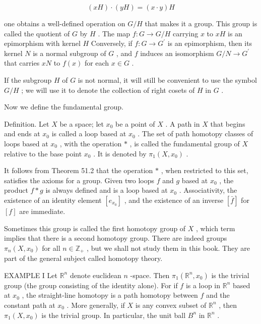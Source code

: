 \[
\left( {xH}\right)  \cdot  \left( {yH}\right)  = \left( {x \cdot  y}\right) H
\]

one obtains a well-defined operation on \(G/H\) that makes it a group. This group is called the quotient of \(G\) by \(H\) . The map \(f : G \rightarrow  G/H\) carrying \(x\) to \({xH}\) is an epimorphism with kernel \(H\) Conversely, if \(f : G \rightarrow  {G}^{\prime }\) is an epimorphism, then its kernel \(N\) is a normal subgroup of \(G\) , and \(f\) induces an isomorphism \(G/N \rightarrow  {G}^{\prime }\) that carries \({xN}\) to \(f\left( x\right)\) for each \(x \in  G\) .

If the subgroup \(H\) of \(G\) is not normal, it will still be convenient to use the symbol \(G/H\) ; we will use it to denote the collection of right cosets of \(H\) in \(G\) .

Now we define the fundamental group.

Definition. Let \(X\) be a space; let \({x}_{0}\) be a point of \(X\) . A path in \(X\) that begins and ends at \({x}_{0}\) is called a loop based at \({x}_{0}\) . The set of path homotopy classes of loops based at \({x}_{0}\) , with the operation \(*\) , is called the fundamental group of \(X\) relative to the base point \({x}_{0}\) . It is denoted by \({\pi }_{1}\left( {X,{x}_{0}}\right)\) .

It follows from Theorem 51.2 that the operation \(*\) , when restricted to this set, satisfies the axioms for a group. Given two loops \(f\) and \(g\) based at \({x}_{0}\) , the product \(f * g\) is always defined and is a loop based at \({x}_{0}\) . Associativity, the existence of an identity element \(\left\lbrack  {e}_{{x}_{0}}\right\rbrack\) , and the existence of an inverse \(\left\lbrack  \bar{f}\right\rbrack\) for \(\left\lbrack  f\right\rbrack\) are immediate.

Sometimes this group is called the first homotopy group of \(X\) , which term implies that there is a second homotopy group. There are indeed groups \({\pi }_{n}\left( {X,{x}_{0}}\right)\) for all \(n \in  {\mathbb{Z}}_{ + }\) , but we shall not study them in this book. They are part of the general subject called homotopy theory.

EXAMPLE I Let \({\mathbb{R}}^{n}\) denote euclidean \(n\) -space. Then \({\pi }_{1}\left( {{\mathbb{R}}^{n},{x}_{0}}\right)\) is the trivial group (the group consisting of the identity alone). For if \(f\) is a loop in \({\mathbb{R}}^{n}\) based at \({x}_{0}\) , the straight-line homotopy is a path homotopy between \(f\) and the constant path at \({x}_{0}\) . More generally, if \(X\) is any convex subset of \({\mathbb{R}}^{n}\) , then \({\pi }_{1}\left( {X,{x}_{0}}\right)\) is the trivial group. In particular, the unit ball \({B}^{n}\) in \({\mathbb{R}}^{n}\) .

